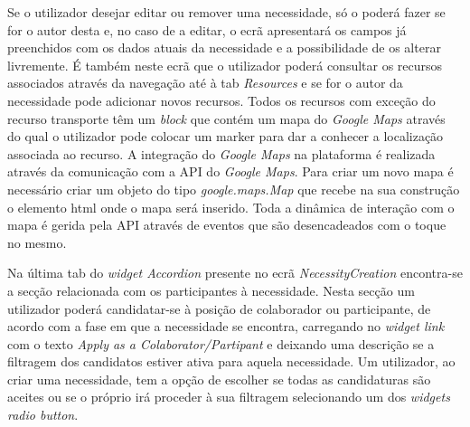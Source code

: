 Se o utilizador desejar editar ou remover uma necessidade, só o poderá fazer se for o autor desta e, no caso de a editar, o ecrã apresentará os campos já preenchidos com os dados atuais da necessidade e a possibilidade de os alterar livremente.
É também neste ecrã que o utilizador poderá consultar os recursos associados através da navegação até à tab \textit{Resources} e se for o autor da necessidade pode adicionar novos recursos. 
Todos os recursos com exceção do recurso transporte têm um \textit{block} que contém um mapa do \textit{Google Maps} através do qual o utilizador pode colocar um marker para dar a conhecer a localização associada ao recurso. 
A integração do \textit{Google Maps} na plataforma é realizada através da comunicação com a API do \textit{Google Maps}. Para criar um novo mapa é necessário criar um objeto do tipo \textit{google.maps.Map} que recebe na sua construção o elemento html onde o mapa será inserido. 
Toda a dinâmica de interação com o mapa é gerida pela API através de eventos que são desencadeados com o toque no mesmo. 

Na última tab do \textit{widget Accordion} presente no ecrã \textit{NecessityCreation} encontra-se a secção relacionada com os participantes à necessidade. 
Nesta secção um utilizador poderá candidatar-se à posição de colaborador ou participante, de acordo com a fase em que a necessidade se encontra, carregando no \textit{widget link} com o texto \textit{Apply as a Colaborator/Partipant} e deixando uma descrição se a filtragem dos candidatos estiver ativa para aquela necessidade.
Um utilizador, ao criar uma necessidade, tem a opção de escolher se todas as candidaturas são aceites ou se o próprio irá proceder à sua filtragem selecionando um dos \textit{widgets radio button}.  